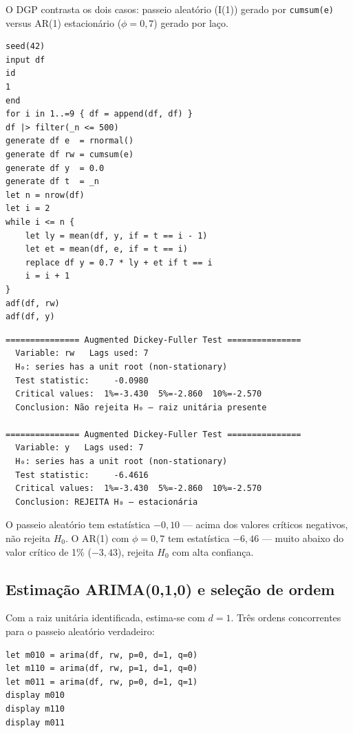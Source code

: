 O DGP contrasta os dois casos: passeio aleatório (I(1)) gerado por
\lstinline{cumsum(e)} versus AR(1) estacionário ($\phi=0{,}7$) gerado por
laço.

\begin{lstlisting}[caption={ADF em passeio aleatório vs.\ AR(1)}]
seed(42)
input df
id
1
end
for i in 1..=9 { df = append(df, df) }
df |> filter(_n <= 500)
generate df e  = rnormal()
generate df rw = cumsum(e)
generate df y  = 0.0
generate df t  = _n
let n = nrow(df)
let i = 2
while i <= n {
    let ly = mean(df, y, if = t == i - 1)
    let et = mean(df, e, if = t == i)
    replace df y = 0.7 * ly + et if t == i
    i = i + 1
}
adf(df, rw)
adf(df, y)
\end{lstlisting}

\begin{lstlisting}[language={}, basicstyle=\ttfamily\small,
  frame=none, numbers=none, backgroundcolor=\color{codbg},
  xleftmargin=0pt, xrightmargin=0pt, breaklines=false]
=============== Augmented Dickey-Fuller Test ===============
  Variable: rw   Lags used: 7
  H₀: series has a unit root (non-stationary)
  Test statistic:     -0.0980
  Critical values:  1%=-3.430  5%=-2.860  10%=-2.570
  Conclusion: Não rejeita H₀ — raiz unitária presente

=============== Augmented Dickey-Fuller Test ===============
  Variable: y   Lags used: 7
  H₀: series has a unit root (non-stationary)
  Test statistic:     -6.4616
  Critical values:  1%=-3.430  5%=-2.860  10%=-2.570
  Conclusion: REJEITA H₀ — estacionária
\end{lstlisting}

O passeio aleatório tem estatística $-0{,}10$ — acima dos valores críticos
negativos, não rejeita $H_0$. O AR(1) com $\phi=0{,}7$
tem estatística $-6{,}46$ — muito abaixo do valor crítico de 1\% ($-3{,}43$),
rejeita $H_0$ com alta confiança.

\subsection*{Estimação ARIMA(0,1,0) e seleção de ordem}

Com a raiz unitária identificada, estima-se com $d=1$. Três ordens
concorrentes para o passeio aleatório verdadeiro:

\begin{lstlisting}[caption={Seleção de ordem para série I(1)}]
let m010 = arima(df, rw, p=0, d=1, q=0)
let m110 = arima(df, rw, p=1, d=1, q=0)
let m011 = arima(df, rw, p=0, d=1, q=1)
display m010
display m110
display m011
\end{lstlisting}

